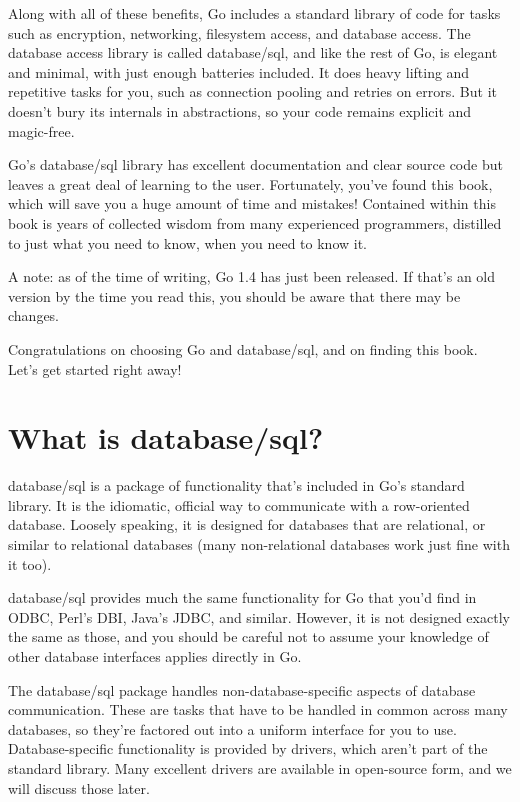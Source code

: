 \documentclass{vivid_layout}
\begin{document}
Along with all of these benefits, Go includes a standard library of code for tasks such as encryption, networking, filesystem access, and database access. The database access library is called database/sql, and like the rest of Go, is elegant and minimal, with just enough batteries included. It does heavy lifting and repetitive tasks for you, such as connection pooling and retries on errors. But it doesn’t bury its internals in abstractions, so your code remains explicit and magic-free.

Go’s database/sql library has excellent documentation and clear source code but leaves a great deal of learning to the user. Fortunately, you’ve found this book, which will save you a huge amount of time and mistakes! Contained within this book is years of collected wisdom from many experienced programmers, distilled to just what you need to know, when you need to know it.

A note: as of the time of writing, Go 1.4 has just been released. If that’s an old version by the time you read this, you should be aware that there may be changes.

Congratulations on choosing Go and database/sql, and on finding this book. Let’s get started right away!

\section{What is database/sql?}

database/sql is a package of functionality that’s included in Go’s standard library. It is the idiomatic, official way to communicate with a row-oriented database. Loosely speaking, it is designed for databases that are relational, or similar to relational databases (many non-relational databases work just fine with it too).

database/sql provides much the same functionality for Go that you’d find in ODBC, Perl’s DBI, Java’s JDBC, and similar. However, it is not designed exactly the same as those, and you should be careful not to assume your knowledge of other database interfaces applies directly in Go.

The database/sql package handles non-database-specific aspects of database communication. These are tasks that have to be handled in common across many databases, so they’re factored out into a uniform interface for you to use. Database-specific functionality is provided by drivers, which aren’t part of the standard library. Many excellent drivers are available in open-source form, and we will discuss those later.
\end{document}
